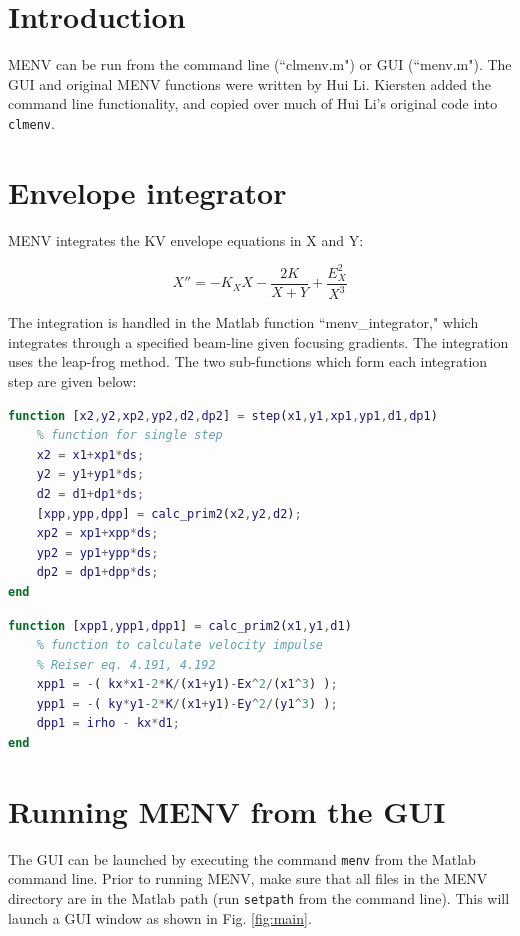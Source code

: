\documentclass[../menv_main.tex]{subfiles}
\begin{document}
\section{Introduction}

MENV can be run from the command line (``clmenv.m") or GUI (``menv.m"). The GUI and original MENV functions were written by Hui Li. Kiersten added the command line functionality, and copied over much of Hui Li's original code into \verb|clmenv|. 

\section{Envelope integrator}

MENV integrates the KV envelope equations in X and Y:

\begin{equation}
X''=-K_X X - \frac{2\mathit{K}}{X+Y} + \frac{E_X^2}{X^3}
\end{equation}

The integration is handled in the Matlab function ``menv\_integrator," which integrates through a specified beam-line given focusing gradients. The integration uses the leap-frog method. The two sub-functions which form each integration step are given below:

\begin{lstlisting}[language=Matlab]
function [x2,y2,xp2,yp2,d2,dp2] = step(x1,y1,xp1,yp1,d1,dp1)
	% function for single step
	x2 = x1+xp1*ds;
	y2 = y1+yp1*ds;
	d2 = d1+dp1*ds;
	[xpp,ypp,dpp] = calc_prim2(x2,y2,d2);
	xp2 = xp1+xpp*ds;
	yp2 = yp1+ypp*ds;
	dp2 = dp1+dpp*ds;
end
\end{lstlisting}

\begin{lstlisting}[language=Matlab]
function [xpp1,ypp1,dpp1] = calc_prim2(x1,y1,d1)
	% function to calculate velocity impulse
	% Reiser eq. 4.191, 4.192
	xpp1 = -( kx*x1-2*K/(x1+y1)-Ex^2/(x1^3) );
	ypp1 = -( ky*y1-2*K/(x1+y1)-Ey^2/(y1^3) );
	dpp1 = irho - kx*d1;
end
\end{lstlisting}


\section{Running MENV from the GUI}

The GUI can be launched by executing the command \verb|menv| from the Matlab command line. Prior to running MENV, make sure that all files in the MENV directory are in the Matlab path (run \verb|setpath| from the command line). This will launch a GUI window as shown in Fig. \ref{fig:main}.
\end{document}
